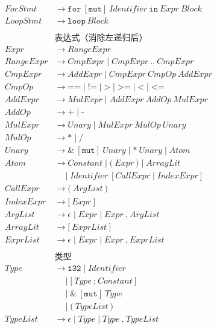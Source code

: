 \documentclass[12pt,a4paper]{ctexart}
\begin{document}
{\begin{align}
ForStmt &\rightarrow \texttt{for} \ [\texttt{mut}] \ Identifier \ \texttt{in} \ Expr \ Block \\
LoopStmt &\rightarrow \texttt{loop} \ Block \\
\\
&\textbf{表达式（消除左递归后）} \\
Expr &\rightarrow RangeExpr \\
RangeExpr &\rightarrow CmpExpr \mid CmpExpr \ \texttt{..} \ CmpExpr \\
CmpExpr &\rightarrow AddExpr \mid CmpExpr \ CmpOp \ AddExpr \\
CmpOp &\rightarrow \texttt{==} \mid \texttt{!=} \mid \texttt{>} \mid \texttt{>=} \mid \texttt{<} \mid \texttt{<=} \\
AddExpr &\rightarrow MulExpr \mid AddExpr \ AddOp \ MulExpr \\
AddOp &\rightarrow \texttt{+} \mid \texttt{-} \\
MulExpr &\rightarrow Unary \mid MulExpr \ MulOp \ Unary \\
MulOp &\rightarrow \texttt{*} \mid \texttt{/} \\
Unary &\rightarrow \texttt{\&} \ [\texttt{mut}] \ Unary \mid \texttt{*} \ Unary \mid Atom \\
Atom &\rightarrow Constant \mid \texttt{(} \ Expr \ \texttt{)} \mid ArrayLit \\
     &\quad\mid Identifier \ [CallExpr \mid IndexExpr] \\
CallExpr &\rightarrow \texttt{(} \ ArgList \ \texttt{)} \\
IndexExpr &\rightarrow \texttt{[} \ Expr \ \texttt{]} \\
ArgList &\rightarrow \epsilon \mid Expr \mid Expr \ \texttt{,} \ ArgList \\
ArrayLit &\rightarrow \texttt{[} \ ExprList \ \texttt{]} \\
ExprList &\rightarrow \epsilon \mid Expr \mid Expr \ \texttt{,} \ ExprList \\
\\
&\textbf{类型} \\
Type &\rightarrow \texttt{i32} \mid Identifier \\
     &\quad\mid \texttt{[} \ Type \ \texttt{;} \ Constant \ \texttt{]} \\
     &\quad\mid \texttt{\&} \ [\texttt{mut}] \ Type \\
     &\quad\mid \texttt{(} \ TypeList \ \texttt{)} \\
TypeList &\rightarrow \epsilon \mid Type \mid Type \ \texttt{,} \ TypeList
\end{align}
}
\end{document}
